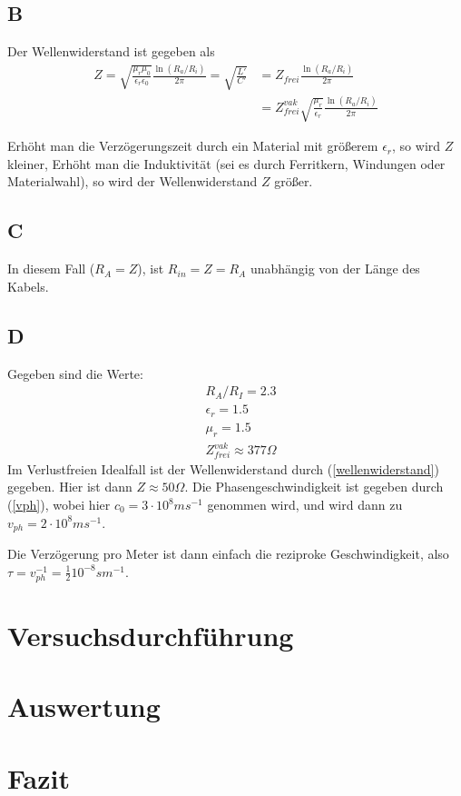 \section{B}
Der Wellenwiderstand ist gegeben als
\begin{align}
    Z = \sqrt{\frac{\mu_r \mu_0}{\epsilon_r \epsilon_0}} \frac{\ln(R_a / R_i)}{2 \pi} = \sqrt{\frac{L'}{C'}} &= Z_{frei} \frac{\ln(R_a / R_i)}{2 \pi}\\
    &= Z_{frei}^{vak} \sqrt{\frac{\mu_r}{\epsilon_r}}\frac{\ln(R_a / R_i)}{2 \pi} \label{wellenwiderstand}
\end{align}

Erhöht man die Verzögerungszeit durch ein Material mit größerem $\epsilon_r$, so wird $Z$ kleiner, Erhöht man die Induktivität (sei es durch Ferritkern, Windungen oder Materialwahl), so wird der Wellenwiderstand $Z$ größer.

\section{C}
In diesem Fall ($R_A = Z$), ist $R_{in} = Z = R_A$ unabhängig von der Länge des Kabels.

\section{D}
Gegeben sind die Werte:
\begin{align}
    &R_A / R_I = 2.3\\
    &\epsilon_r = 1.5\\
    &\mu_r = 1.5\\
    &Z_{frei}^{vak} \approx 377\Omega\label{zfrei}
\end{align}
Im Verlustfreien Idealfall ist der Wellenwiderstand durch (\ref{wellenwiderstand}) gegeben. Hier ist dann $Z \approx 50\Omega$.
Die Phasengeschwindigkeit ist gegeben durch (\ref{vph}), wobei hier $c_0 = 3 \cdot 10^8 m s^{-1}$ genommen wird, und wird dann zu $v_{ph} = 2 \cdot 10^8 m s^{-1}$.

Die Verzögerung pro Meter ist dann einfach die reziproke Geschwindigkeit, also $\tau = v_{ph}^{-1} = \frac12 10^{-8} s m^{-1}$.

\chapter{Versuchsdurchführung}

\chapter{Auswertung}

\chapter{Fazit}


